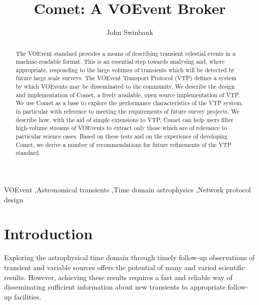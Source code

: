 \documentclass[5p,authoryear]{elsarticle}
\begin{document}
\begin{frontmatter}

\title{Comet: A VOEvent Broker}

\author{John Swinbank}

\address{Anton Pannekoek Institute, University of Amsterdam, Postbus 94249, 1090 GE Amsterdam, The Netherlands}

\begin{abstract}

The VOEvent standard provides a means of describing transient celestial events
in a machine-readable format. This is an essential step towards analysing and,
where appropriate, responding to the large volumes of transients which will be
detected by future large scale surveys. The VOEvent Transport Protocol (VTP)
defines a system by which VOEvents may be disseminated to the community. We
describe the design and implementation of Comet, a freely available, open
source implementation of VTP. We use Comet as a base to explore the
performance characteristics of the VTP system, in particular with reference to
meeting the requirements of future survey projects. We describe how,
with the aid of simple extensions to VTP, Comet can help users filter
high-volume streams of VOEvents to extract only those which are of relevance
to particular science cases.  Based on these tests and on the experience of
developing Comet, we derive a number of recommendations for future refinements
of the VTP standard.

\end{abstract}

\begin{keyword}
VOEvent \sep Astronomical transients \sep Time domain astrophysics \sep Network protocol design
\end{keyword}

\end{frontmatter}

\section{Introduction}
\label{sec:intro}

Exploring the astrophysical time domain through timely follow-up observations
of transient and variable sources offers the potential of many and varied
scientific results. However, achieving these results requires a fast and
reliable way of disseminating sufficient information about new transients to
appropriate follow-up facilities.
\end{document}
